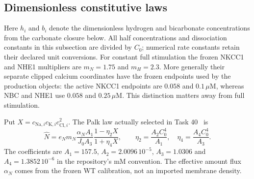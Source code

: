\subsection{Dimensionless constitutive laws}
Here $h_i$ and $b_i$ denote the dimensionless hydrogen and bicarbonate
concentrations from the carbonate closure below.  All half concentrations
and dissociation constants in this subsection are divided by $C_0$;
numerical rate constants retain their declared unit conversions.
For constant full stimulation the frozen NKCC1 and NHE1 multipliers are
$m_N=1.75$ and $m_H=2.3$.  More generally their separate clipped calcium
coordinates have the frozen endpoints used by the production objects:
the active NKCC1 endpoints are $0.058$ and $0.1\,\mu\mathrm M$,
whereas NBC and NHE1 use $0.058$ and $0.25\,\mu\mathrm M$.
This distinction matters away from full stimulation.

Put $X=c_{\mathrm{Na},i}c_{\mathrm K,i}c_{\mathrm{Cl},i}^{2}$.  The
Palk law actually selected in Task 40~\cite{Palk2010} is
\begin{equation}
 \widehat N=e_Nm_N\frac{\alpha_N A_1}{J_0A_3}
   \frac{1-\eta_2X}{1+\eta_4X},\qquad
 \eta_2=\frac{A_2C_0^4}{A_1},\quad
 \eta_4=\frac{A_4C_0^4}{A_3}.
 \label{eq:dimless-nkcc}
\end{equation}
The coefficients are $A_1=157.5$, $A_2=2.0096\,10^{-5}$,
$A_3=1.0306$ and $A_4=1.3852\,10^{-6}$ in the repository's mM
convention.  The effective amount flux $\alpha_N$ comes from the frozen
WT calibration, not an imported membrane density.

